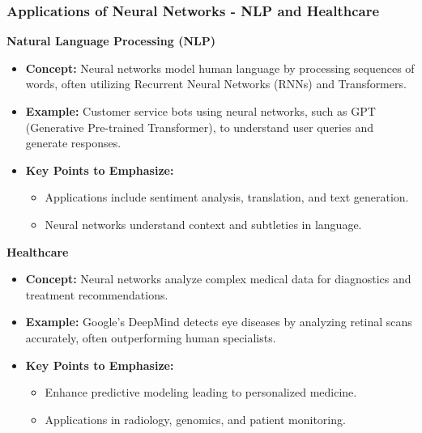 \documentclass[aspectratio=169]{beamer}
\begin{document}
\begin{frame}[fragile]
  \frametitle{Applications of Neural Networks - NLP and Healthcare}
  \textbf{Natural Language Processing (NLP)}
  \begin{itemize}
      \item \textbf{Concept:} Neural networks model human language by processing sequences of words, often utilizing Recurrent Neural Networks (RNNs) and Transformers.
      
      \item \textbf{Example:} Customer service bots using neural networks, such as GPT (Generative Pre-trained Transformer), to understand user queries and generate responses.
      
      \item \textbf{Key Points to Emphasize:}
      \begin{itemize}
          \item Applications include sentiment analysis, translation, and text generation.
          \item Neural networks understand context and subtleties in language.
      \end{itemize}
  \end{itemize}
  
  \textbf{Healthcare}
  \begin{itemize}
      \item \textbf{Concept:} Neural networks analyze complex medical data for diagnostics and treatment recommendations.
      
      \item \textbf{Example:} Google’s DeepMind detects eye diseases by analyzing retinal scans accurately, often outperforming human specialists.
      
      \item \textbf{Key Points to Emphasize:}
      \begin{itemize}
          \item Enhance predictive modeling leading to personalized medicine.
          \item Applications in radiology, genomics, and patient monitoring.
      \end{itemize}
  \end{itemize}
\end{frame}
\end{document}
